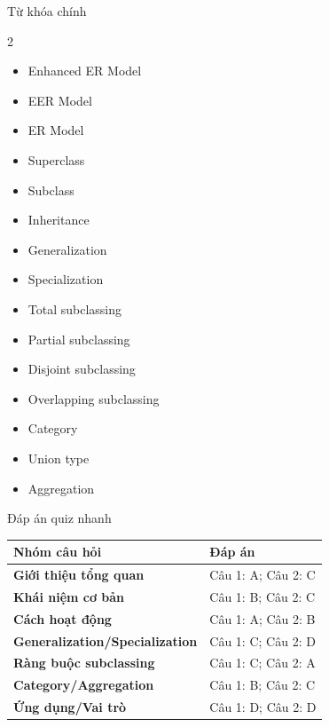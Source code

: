 \documentclass[aspectratio=169,11pt]{beamer}
\begin{document}
\begin{frame}{Từ khóa chính}
\begin{multicols}{2}
\begin{itemize}
    \item Enhanced ER Model
    \item EER Model
    \item ER Model
    \item Superclass
    \item Subclass
    \item Inheritance
    \item Generalization
    \item Specialization
    \item Total subclassing
    \item Partial subclassing
    \item Disjoint subclassing
    \item Overlapping subclassing
    \item Category
    \item Union type
    \item Aggregation
\end{itemize}
\end{multicols}
\end{frame}

\begin{frame}{Đáp án quiz nhanh}
\scriptsize
\begin{tabularx}{\textwidth}{>{\bfseries}lX}
\toprule
Nhóm câu hỏi & Đáp án \\
\midrule
Giới thiệu tổng quan & Câu 1: A; Câu 2: C \\
Khái niệm cơ bản & Câu 1: B; Câu 2: C \\
Cách hoạt động & Câu 1: A; Câu 2: B \\
Generalization/Specialization & Câu 1: C; Câu 2: D \\
Ràng buộc subclassing & Câu 1: C; Câu 2: A \\
Category/Aggregation & Câu 1: B; Câu 2: C \\
Ứng dụng/Vai trò & Câu 1: D; Câu 2: D \\
\bottomrule
\end{tabularx}
\end{frame}
\end{document}

